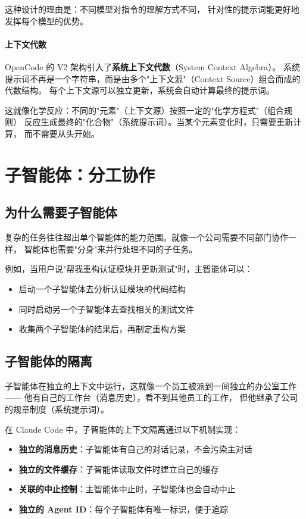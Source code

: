 这种设计的理由是：不同模型对指令的理解方式不同，
针对性的提示词能更好地发挥每个模型的优势。

\paragraph{上下文代数}
OpenCode 的 V2 架构引入了\textbf{系统上下文代数}（System Context Algebra）。
系统提示词不再是一个字符串，而是由多个"上下文源"（Context Source）组合而成的代数结构。
每个上下文源可以独立更新，系统会自动计算最终的提示词。

这就像化学反应：不同的"元素"（上下文源）按照一定的"化学方程式"（组合规则）
反应生成最终的"化合物"（系统提示词）。当某个元素变化时，只需要重新计算，
而不需要从头开始。

\section{子智能体：分工协作}

\subsection{为什么需要子智能体}

复杂的任务往往超出单个智能体的能力范围。就像一个公司需要不同部门协作一样，
智能体也需要"分身"来并行处理不同的子任务。

例如，当用户说"帮我重构认证模块并更新测试"时，主智能体可以：
\begin{itemize}
    \item 启动一个子智能体去分析认证模块的代码结构
    \item 同时启动另一个子智能体去查找相关的测试文件
    \item 收集两个子智能体的结果后，再制定重构方案
\end{itemize}

\subsection{子智能体的隔离}

子智能体在独立的上下文中运行，这就像一个员工被派到一间独立的办公室工作——
他有自己的工作台（消息历史），看不到其他员工的工作，
但他继承了公司的规章制度（系统提示词）。

在 Claude Code 中，子智能体的上下文隔离通过以下机制实现：

\begin{itemize}
    \item \textbf{独立的消息历史}：子智能体有自己的对话记录，不会污染主对话
    \item \textbf{独立的文件缓存}：子智能体读取文件时建立自己的缓存
    \item \textbf{关联的中止控制}：主智能体中止时，子智能体也会自动中止
    \item \textbf{独立的 Agent ID}：每个子智能体有唯一标识，便于追踪
\end{itemize}

